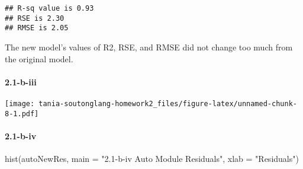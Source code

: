 \documentclass[
]{article}
\newenvironment{Shaded}{\begin{snugshade}}{\end{snugshade}}
\newcommand{\AttributeTok}[1]{\textcolor[rgb]{0.77,0.63,0.00}{#1}}
\newcommand{\DecValTok}[1]{\textcolor[rgb]{0.00,0.00,0.81}{#1}}
\newcommand{\FunctionTok}[1]{\textcolor[rgb]{0.00,0.00,0.00}{#1}}
\newcommand{\NormalTok}[1]{#1}
\newcommand{\OtherTok}[1]{\textcolor[rgb]{0.56,0.35,0.01}{#1}}
\newcommand{\SpecialCharTok}[1]{\textcolor[rgb]{0.00,0.00,0.00}{#1}}
\newcommand{\StringTok}[1]{\textcolor[rgb]{0.31,0.60,0.02}{#1}}
\begin{document}
\begin{Shaded}
\end{Shaded}

\begin{verbatim}
## R-sq value is 0.93
## RSE is 2.30
## RMSE is 2.05
\end{verbatim}

The new model's values of R2, RSE, and RMSE did not change too much from
the original model.

\hypertarget{b-iii}{%
\paragraph{2.1-b-iii}\label{b-iii}}

\begin{Shaded}
\end{Shaded}

\texttt{[image: tania-soutonglang-homework2\_files/figure-latex/unnamed-chunk-8-1.pdf]}

\hypertarget{b-iv}{%
\paragraph{2.1-b-iv}\label{b-iv}}

\begin{Shaded}
\begin{Highlighting}[]
\FunctionTok{hist}\NormalTok{(autoNewRes, }\AttributeTok{main =} \StringTok{"2.1{-}b{-}iv Auto Module Residuals"}\NormalTok{, }\AttributeTok{xlab =} \StringTok{"Residuals"}\NormalTok{)}
\end{Highlighting}
\end{Shaded}
\end{document}
